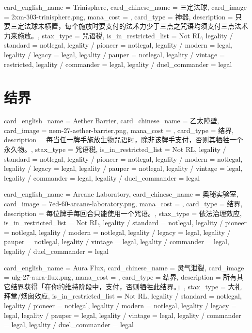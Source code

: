 \documentclass[lang = cn, color = black, 10pt]{AllThatStax}
\begin{document}
\card
{
	card_english_name = {Trinisphere},
	card_chinese_name = {三定法球},
	card_image = 2xm-303-trinisphere.png,
	mana_cost = ,
	card_type = 神器,
	description = {只要三定法球未横置，每个施放时要支付的法术力少于三点之咒语均须支付三点法术力来施放。},
	stax_type = 咒语税,
	is_in_restricted_list = Not RL,
	legality / standard = notlegal,
	legality / pioneer = notlegal,
	legality / modern = legal,
	legality / legacy = legal,
	legality / pauper = notlegal,
	legality / vintage = restricted,
	legality / commander = legal,
	legality / duel_commander = legal
}

\section{结界}

\card
{
	card_english_name = {Aether Barrier},
	card_chinese_name = {乙太障壁},
	card_image = nem-27-aether-barrier.png,
	mana_cost = ,
	card_type = 结界,
	description = {每当任一牌手施放生物咒语时，除非该牌手支付，否则其牺牲一个永久物。},
	stax_type = 咒语税,
	is_in_restricted_list = Not RL,
	legality / standard = notlegal,
	legality / pioneer = notlegal,
	legality / modern = notlegal,
	legality / legacy = legal,
	legality / pauper = notlegal,
	legality / vintage = legal,
	legality / commander = legal,
	legality / duel_commander = legal
}

\card
{
	card_english_name = {Arcane Laboratory},
	card_chinese_name = {奥秘实验室},
	card_image = 7ed-60-arcane-laboratory.png,
	mana_cost = ,
	card_type = 结界,
	description = {每位牌手每回合只能使用一个咒语。},
	stax_type = 依法治理效应,
	is_in_restricted_list = Not RL,
	legality / standard = notlegal,
	legality / pioneer = notlegal,
	legality / modern = notlegal,
	legality / legacy = legal,
	legality / pauper = notlegal,
	legality / vintage = legal,
	legality / commander = legal,
	legality / duel_commander = legal
}

\card
{
	card_english_name = {Aura Flux},
	card_chinese_name = {灵气泄裂},
	card_image = ulg-27-aura-flux.png,
	mana_cost = ,
	card_type = 结界,
	description = {所有其它结界获得「在你的维持阶段中，支付，否则牺牲此结界。」},
	stax_type = 大礼拜堂/烟囱效应,
	is_in_restricted_list = Not RL,
	legality / standard = notlegal,
	legality / pioneer = notlegal,
	legality / modern = notlegal,
	legality / legacy = legal,
	legality / pauper = legal,
	legality / vintage = legal,
	legality / commander = legal,
	legality / duel_commander = legal
}
\end{document}
